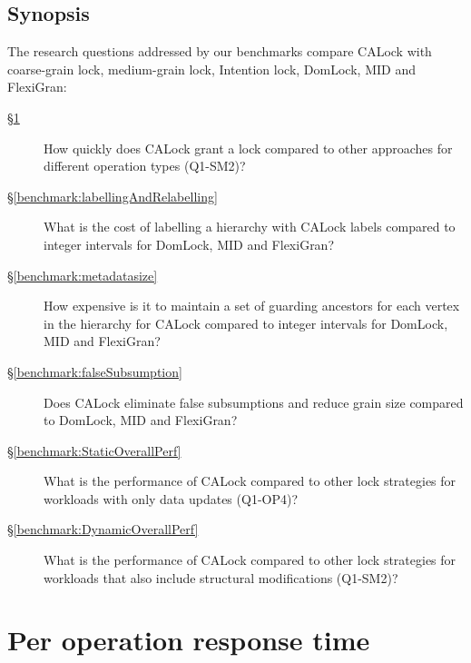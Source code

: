 	\subsection{Synopsis}

	The research questions addressed by our benchmarks compare CALock with coarse-grain lock, medium-grain lock, Intention lock, DomLock, MID and FlexiGran:

	\begin{description}
		\item[\S \ref{benchmark:PerOpLatency}] How quickly does CALock grant a lock compared to other approaches for different operation types (Q1-SM2)?
		
		\item[\S \ref{benchmark:labellingAndRelabelling}] What is the cost of labelling a hierarchy with CALock labels compared to integer intervals for DomLock, MID and FlexiGran?
		
		\item [\S \ref{benchmark:metadatasize}] How expensive is it to maintain a set of guarding ancestors for each vertex in the hierarchy for CALock compared to integer intervals for DomLock, MID and FlexiGran? 
	
		\item[\S \ref{benchmark:falseSubsumption}] Does CALock eliminate false subsumptions and reduce grain size compared to DomLock, MID and FlexiGran?
		\item[\S \ref{benchmark:StaticOverallPerf}] What is the performance of CALock compared to other lock strategies for workloads with only data updates (Q1-OP4)?
	
		\item[\S \ref{benchmark:DynamicOverallPerf}] What is the performance of CALock compared to other lock strategies for workloads that also include structural modifications (Q1-SM2)?
	\end{description}
	
	
\section{Per operation response time} \label{benchmark:PerOpLatency}

